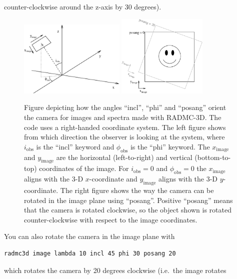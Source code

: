 \documentclass{report}
\newenvironment{asciibox}%
  {\begin{list}{}{%
    \setlength{\topsep}{0.5em}%
    \setlength{\parskip}{0em}%
    \setlength{\parsep}{0em}%
    \setlength{\itemsep}{0em}%
    \setlength{\rightmargin}{0em}%
    \setlength{\leftmargin}{3.0em}%
    \setlength{\labelsep}{1em}%
    \setlength{\labelwidth}{2em}%
  }\normalfont\footnotesize\item}
  {\end{list}}
\begin{document}
counter-clockwise around the z-axis by 30 degrees). 
%
\begin{figure}
\centerline{\includegraphics[width=0.45\textwidth]{camera_orient.eps}
  \hspace{3em}\includegraphics[width=0.38\textwidth]{posang.eps}}
\caption{\label{fig-cameraorient}
%
Figure depicting how the angles ``incl'', ``phi'' and ``posang'' orient
the camera for images and spectra made with RADMC-3D. The code uses a right-handed
coordinate system. The left figure shows from which direction the observer
is looking at the system, where $i_{\mathrm{obs}}$ is the ``incl'' keyword
and $\phi_{\mathrm{obs}}$ is the ``phi'' keyword. The $x_{\mathrm{image}}$ and
$y_{\mathrm{image}}$ are the horizontal (left-to-right) and vertical (bottom-to-top)
coordinates of the image. For $i_{\mathrm{obs}}=0$ and $\phi_{\mathrm{obs}}=0$
the $x_{\mathrm{image}}$ aligns with the 3-D $x$-coordinate and 
$y_{\mathrm{image}}$ aligns with the 3-D $y$-coordinate. The right figure shows
the way the camera can be rotated in the image plane using ``posang''. Positive
``posang'' means that the camera is rotated clockwise, so the object shown
is rotated counter-clockwise with respect to the image coordinates.
%
}
\end{figure}
%
You can also rotate the
camera in the image plane with
\begin{asciibox}\begin{verbatim}
radmc3d image lambda 10 incl 45 phi 30 posang 20
\end{verbatim}\end{asciibox}
which rotates the camera by 20 degrees clockwise (i.e.\ the image rotates
\end{document}

